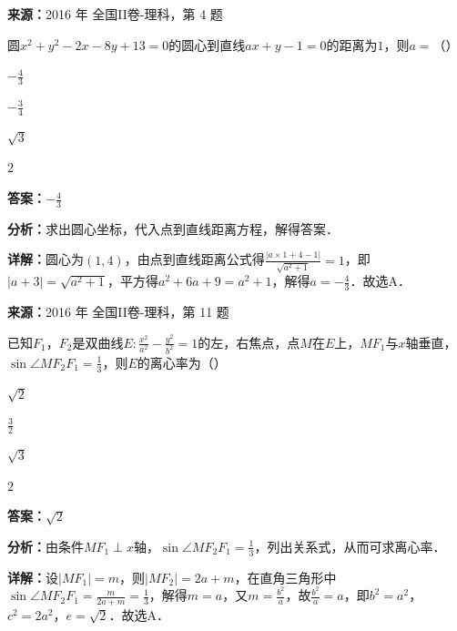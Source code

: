\begin{question}[points=5]
\textbf{来源：}2016 年 全国II卷-理科，第 4 题\par
圆$x^2+y^2-2x-8y+13=0$的圆心到直线$ax+y-1=0$的距离为$1$，则$a=$（\quad）
\begin{choices}
  \item $-\frac{4}{3}$
  \item $-\frac{3}{4}$
  \item $\sqrt{3}$
  \item $2$
\end{choices}
\begin{solution}
\textbf{答案：}$-\frac{4}{3}$

\textbf{分析：}求出圆心坐标，代入点到直线距离方程，解得答案．

\textbf{详解：}圆心为$(1,4)$，由点到直线距离公式得$\frac{|a\times1+4-1|}{\sqrt{a^2+1}}=1$，即$|a+3|=\sqrt{a^2+1}$，平方得$a^2+6a+9=a^2+1$，解得$a=-\frac{4}{3}$．故选A．
\end{solution}
\end{question}

\begin{question}[points=5]
\textbf{来源：}2016 年 全国II卷-理科，第 11 题\par
已知$F_1$，$F_2$是双曲线$E:\frac{x^2}{a^2}-\frac{y^2}{b^2}=1$的左，右焦点，点$M$在$E$上，$MF_1$与$x$轴垂直，$\sin\angle MF_2F_1=\frac{1}{3}$，则$E$的离心率为（\quad）
\begin{choices}
  \item $\sqrt{2}$
  \item $\frac{3}{2}$
  \item $\sqrt{3}$
  \item $2$
\end{choices}
\begin{solution}
\textbf{答案：}$\sqrt{2}$

\textbf{分析：}由条件$MF_1\perp x$轴，$\sin\angle MF_2F_1=\frac13$，列出关系式，从而可求离心率．

\textbf{详解：}设$|MF_1|=m$，则$|MF_2|=2a+m$，在直角三角形中$\sin\angle MF_2F_1=\frac{m}{2a+m}=\frac13$，解得$m=a$，又$m=\frac{b^2}{a}$，故$\frac{b^2}{a}=a$，即$b^2=a^2$，$c^2=2a^2$，$e=\sqrt{2}$．故选A．
\end{solution}
\end{question}

